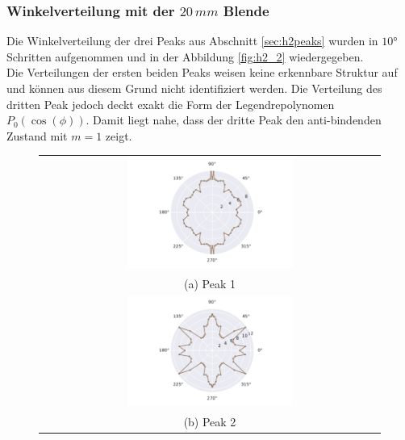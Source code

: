 \subsubsection{Winkelverteilung mit der $20 \, mm$ Blende}
Die Winkelverteilung der drei Peaks aus Abschnitt \ref{sec:h2peaks} wurden in $10°$ Schritten aufgenommen und in der Abbildung \ref{fig:h2_2} wiedergegeben. \\
Die Verteilungen der ersten beiden Peaks weisen keine erkennbare Struktur auf und können aus diesem Grund nicht identifiziert werden.  Die Verteilung des dritten Peak jedoch 
deckt exakt die Form der Legendrepolynomen $P_0(\cos(\phi))$. Damit liegt nahe, dass der dritte Peak den anti-bindenden Zustand mit $m=1$ zeigt.  
\begin{figure}[H]
  \centering
  \begin{tabular}{cc}
  \multicolumn{2}{c}{\includegraphics[width=0.5\textwidth]{Daten/Wasserstoffmolekuelion/peak0.pdf}}\\[6pt]
  \multicolumn{2}{c}{(a) Peak 1}\\[6pt]
  \multicolumn{2}{c}{\includegraphics[width=0.5\textwidth]{Daten/Wasserstoffmolekuelion/peak1.pdf}}\\[6pt]
  \multicolumn{2}{c}{(b) Peak 2}\\[6pt]

\end{tabular}
\end{figure}

